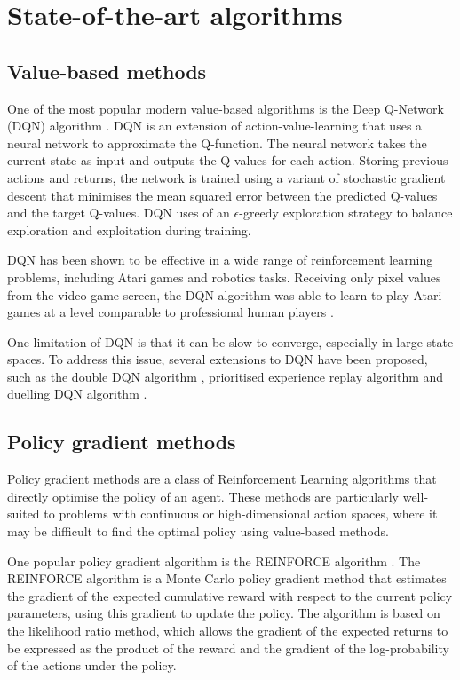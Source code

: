 \section{State-of-the-art algorithms}
\label{sec:rl_algs}

\subsection{Value-based methods}
One of the most popular modern value-based algorithms is the Deep Q-Network (DQN) algorithm \autocite{mnih2013}.
DQN is an extension of action-value-learning that uses a neural network to approximate the Q-function.
The neural network takes the current state as input and outputs the Q-values for each action.
Storing previous actions and returns, the network is trained using a variant of stochastic gradient descent that minimises the mean squared error between the predicted Q-values and the target Q-values.
DQN uses of an $\epsilon$-greedy exploration strategy to balance exploration and exploitation during training.

DQN has been shown to be effective in a wide range of reinforcement learning problems, including Atari games and robotics tasks.
Receiving only pixel values from the video game screen, the DQN algorithm was able to learn to play Atari games at a level comparable to professional human players \autocite{mnih2015}.

One limitation of DQN is that it can be slow to converge, especially in large state spaces.
To address this issue, several extensions to DQN have been proposed, such as the double DQN algorithm \autocite{hasselt2016}, prioritised experience replay algorithm \autocite{schaul2015} and duelling DQN algorithm \autocite{wang2016}.

\subsection{Policy gradient methods}
Policy gradient methods are a class of Reinforcement Learning algorithms that directly optimise the policy of an agent.
These methods are particularly well-suited to problems with continuous or high-dimensional action spaces, where it may be difficult to find the optimal policy using value-based methods.

One popular policy gradient algorithm is the REINFORCE algorithm \autocite{williams1992}.
The REINFORCE algorithm is a Monte Carlo policy gradient method that estimates the gradient of the expected cumulative reward with respect to the current policy parameters, using this gradient to update the policy.
The algorithm is based on the likelihood ratio method, which allows the gradient of the expected returns to be expressed as the product of the reward and the gradient of the log-probability of the actions under the policy.

